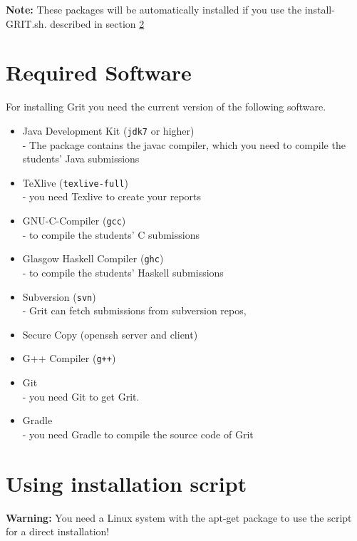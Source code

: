 \documentclass[10pt,a4paper, titlepage, toc=idx]{scrreprt}
\theoremstyle{definition}
\theoremstyle{plain}
\newcommand*{\product}{Grit}
\begin{document}
\noindent \textbf{Note:} These packages will be automatically installed if you use the install-GRIT.sh. described in section \ref{3.2}


\section{Required Software}\label{3.1} For installing \product{} you need the current version of the following software.\\

\begin{itemize}
\item Java Development Kit (\texttt{jdk7} or higher)\\
		- The package contains the javac compiler, which you need to compile the students' Java submissions
\item \TeX  live (\texttt{texlive-full})\\
		- you need Texlive to create your reports
\item GNU-C-Compiler (\texttt{gcc})\\
		- to compile the students' C submissions
\item Glasgow Haskell Compiler (\texttt{ghc})\\
		- to compile the students' Haskell submissions
\item Subversion (\texttt{svn})\\
		- \product{} can fetch submissions from subversion repos, 
\item Secure Copy (openssh server and client)
\item G++ Compiler (\texttt{g++})
\item Git\\
		- you need Git to get \product.
\item Gradle\\
		- you need Gradle to compile the source code of \product
\end{itemize}

\section{Using installation script}\label{3.2}
\textbf{Warning:} You need a Linux system with the apt-get package to use the script for a direct installation!\\
\end{document}
